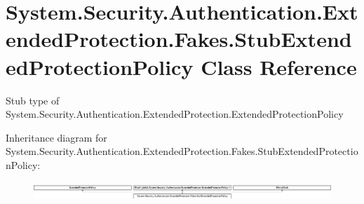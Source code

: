 \hypertarget{class_system_1_1_security_1_1_authentication_1_1_extended_protection_1_1_fakes_1_1_stub_extended_protection_policy}{\section{System.\-Security.\-Authentication.\-Extended\-Protection.\-Fakes.\-Stub\-Extended\-Protection\-Policy Class Reference}
\label{class_system_1_1_security_1_1_authentication_1_1_extended_protection_1_1_fakes_1_1_stub_extended_protection_policy}
}


Stub type of System.\-Security.\-Authentication.\-Extended\-Protection.\-Extended\-Protection\-Policy 


Inheritance diagram for System.\-Security.\-Authentication.\-Extended\-Protection.\-Fakes.\-Stub\-Extended\-Protection\-Policy\-:\begin{figure}[H]
\begin{center}
\leavevmode
\includegraphics[height=0.683761cm]{class_system_1_1_security_1_1_authentication_1_1_extended_protection_1_1_fakes_1_1_stub_extended_protection_policy}
\end{center}
\end{figure}
